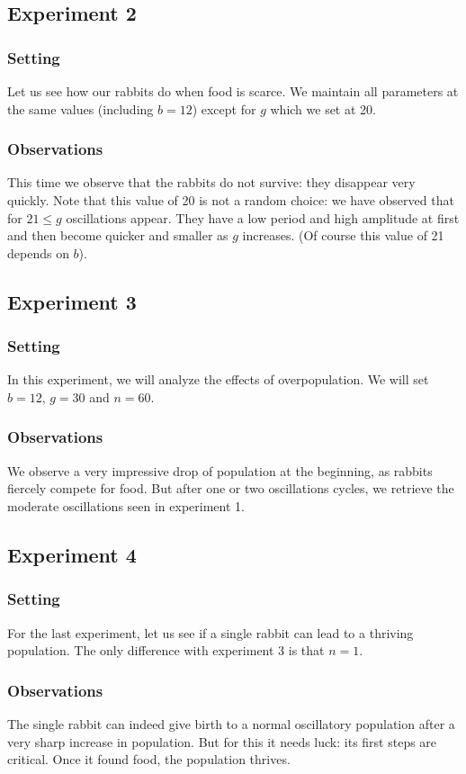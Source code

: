 \documentclass[11pt]{article}
\begin{document}
\subsection{Experiment 2}

\subsubsection{Setting}
Let us see how our rabbits do when food is scarce. We maintain all parameters at the same values (including $b=12$) except for $g$ which we set at 20.

\subsubsection{Observations}
This time we observe that the rabbits do not survive: they disappear very quickly. Note that this value of 20 is not a random choice: we have observed that for $21 \leq g$ oscillations appear. They have a low period and high amplitude at first and then become quicker and smaller as $g$ increases. (Of course this value of 21 depends on $b$). 


\subsection{Experiment 3}

\subsubsection{Setting}
In this experiment, we will analyze the effects of overpopulation. We will set $b=12$, $g=30$ and $n=60$.

\subsubsection{Observations}
We observe a very impressive drop of population at the beginning, as rabbits fiercely compete for food. But after one or two oscillations cycles, we retrieve the moderate oscillations seen in experiment 1.

\subsection{Experiment 4}
\subsubsection{Setting}
For the last experiment, let us see if a single rabbit can lead to a thriving population. The only difference with experiment 3 is that $n=1$.

\subsubsection{Observations}
The single rabbit can indeed give birth to a normal oscillatory population after a very sharp increase in population. But for this it needs luck: its first steps are critical. Once it found food, the population thrives.
\end{document}
